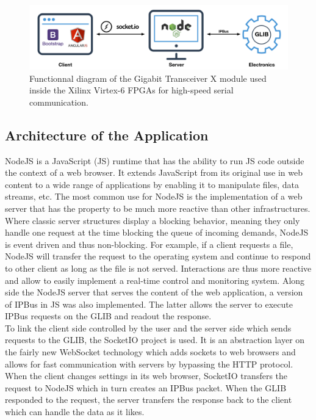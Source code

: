     \begin{figure}[h!]
      \centering
      \includegraphics[width=\textwidth]{img/II-3-test-beam/app-layout.png}
      \caption{Functionnal diagram of the Gigabit Transceiver X module used inside the Xilinx Virtex-6 FPGAs for high-speed serial communication.}
      \label{fig:II-3-app-layout}
    \end{figure}

    \subsection{Architecture of the Application}

      NodeJS is a JavaScript (JS) runtime that has the ability to run JS code outside the context of a web browser. It extends JavaScript from its original use in web content to a wide range of applications by enabling it to manipulate files, data streams, etc. The most common use for NodeJS is the implementation of a web server that has the property to be much more reactive than other infrastructures. Where classic server structures display a blocking behavior, meaning they only handle one request at the time blocking the queue of incoming demands, NodeJS is event driven and thus non-blocking. For example, if a client requests a file, NodeJS will transfer the request to the operating system and continue to respond to other client as long as the file is not served. Interactions are thus more reactive and allow to easily implement a real-time control and monitoring system. Along side the NodeJS server that serves the content of the web application, a version of IPBus in JS was also implemented. The latter allows the server to execute IPBus requests on the GLIB and readout the response. \\

      To link the client side controlled by the user and the server side which sends requests to the GLIB, the SocketIO project is used. It is an abstraction layer on the fairly new WebSocket technology which adds sockets to web browsers and allows for fast communication with servers by bypassing the HTTP protocol. When the client changes settings in its web browser, SocketIO transfers the request to NodeJS which in turn creates an IPBus packet. When the GLIB responded to the request, the server transfers the response back to the client which can handle the data as it likes. \\

